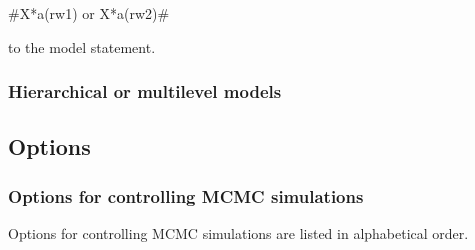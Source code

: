 #X*a(rw1) or X*a(rw2)#

to the model statement.

\subsubsection{Hierarchical or multilevel models}
 \label{mcmcregmultilevelsyntax}

\subsection{Options}
\label{mcmcregregressoptions}

\vspace{0.4cm}

\subsubsection*{Options for controlling MCMC simulations}
\label{mcmc_options}

Options for controlling MCMC simulations are listed in
alphabetical order.

